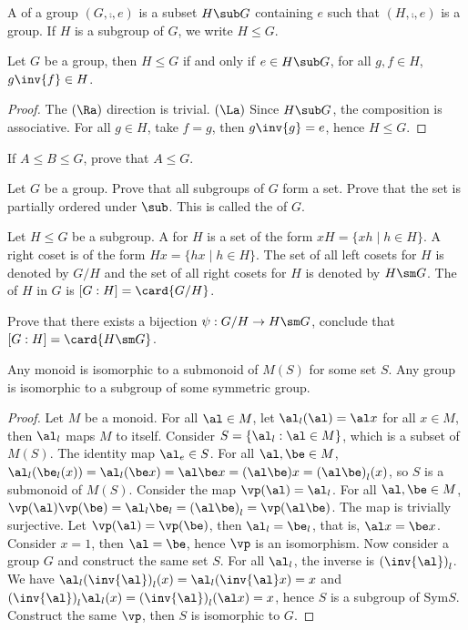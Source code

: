 \documentclass[10pt]{article}
\begin{document}
\begin{definition}
    A  of a group $(G,\comp,e)$ is a subset $H\sub G$ containing $e$ such that $(H,\comp,e)$ is a group. If $H$ is a subgroup of $G$, we write $H\le G$.
\end{definition}
\begin{proposition}
    Let $G$ be a group, then $H\le G$ if and only if $e\in H\sub G$, for all $g,f\in H$, $g\inv{f}\in H$. 
\end{proposition}
\begin{proof}
    The $(\Ra)$ direction is trivial. $(\La)$ Since $H\sub G$, the composition is associative. For all $g\in H$, take $f=g$, then $g\inv{g}=e$, hence $H\le G$.
\end{proof}
\begin{problem}
    If $A\le B\le G$, prove that $A\le G$.
\end{problem}
\begin{problem}
    Let $G$ be a group. Prove that all subgroups of $G$ form a set. Prove that the set is partially ordered under $\sub$. This is called the  of $G$.
\end{problem}
\begin{definition}
    Let $H\le G$ be a subgroup. A  for $H$ is a set of the form $xH=\{xh\mid h\in H\}$. A right coset is of the form $Hx=\{hx\mid h\in H\}$. The set of all left cosets for $H$ is denoted by $G/H$ and the set of all right cosets for $H$ is denoted by $H\sm G$. The  of $H$ in $G$ is $[G:H]=\card{G/H}$.
\end{definition}
\begin{problem}
    Prove that there exists a bijection $\psi:G/H\to H\sm G$, conclude that $[G:H]=\card{H\sm G}$.
\end{problem}
\begin{theorem}
    Any monoid is isomorphic to a submonoid of $M(S)$ for some set $S$. Any group is isomorphic to a subgroup of some symmetric group.
\end{theorem}
\begin{proof}
    Let $M$ be a monoid. For all $\al\in M$, let ${\al}_{l}(\al)=\al x$ for all $x\in M$, then ${\al}_{l}$ maps $M$ to itself. Consider $S=\{{\al}_{l}:\al\in M\}$, which is a subset of $M(S)$. The identity map ${\al}_{e}\in S$. For all $\al,\be\in M$, ${\al}_{l}({\be}_{l}(x))={\al}_{l}(\be x)=\al\be x=(\al\be)x={(\al\be)}_{l}(x)$, so $S$ is a submonoid of $M(S)$. Consider the map $\vp(\al)={\al}_{l}$. For all $\al,\be\in M$, $\vp(\al)\vp(\be)={\al}_{l}{\be}_{l}={(\al\be)}_{l}=\vp(\al\be)$. The map is trivially surjective. Let $\vp(\al)=\vp(\be)$, then ${\al}_{l}={\be}_{l}$, that is, $\al x=\be x$. Consider $x=1$, then $\al=\be$, hence $\vp$ is an isomorphism. Now consider a group $G$ and construct the same set $S$. For all ${\al}_{l}$, the inverse is ${(\inv{\al})}_{l}$. We have ${\al}_{l}{(\inv{\al})}_{l}(x)={\al}_{l}(\inv{\al}x)=x$ and ${(\inv{\al})}_{l}{\al}_{l}(x)={(\inv{\al})}_{l}(\al x)=x$, hence $S$ is a subgroup of $\text{Sym}S$. Construct the same $\vp$, then $S$ is isomorphic to $G$.
\end{proof}
\end{document}
